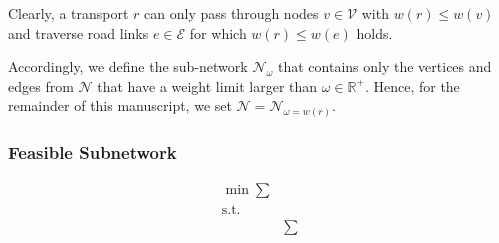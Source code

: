 Clearly, a transport $r$ can only pass through nodes $v \in \mathcal{V}$ with
$w(r) \leq w(v)$ and traverse road links $e \in \mathcal{E}$ for which $w(r) \leq w(e)$ holds.

Accordingly, we define the sub-network $\mathcal{N}_{\omega}$ that contains only the vertices and edges from $\mathcal{N}$ that have a weight limit larger than $\omega \in \mathbb{R}^{+}$.
Hence, for the remainder of this manuscript, we set $\mathcal{N}=\mathcal{N}_{\omega=w(r)}$.

\subsubsection{Feasible Subnetwork}





\begin{align*}
   \min \sum    \\
   \text{s.t.}  &  \\
    & \sum
\end{align*}
